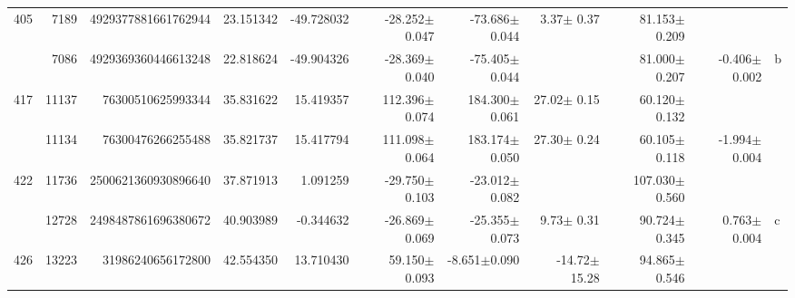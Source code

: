 \documentclass{ws-ijmpd}
\begin{document}
\begin{landscape}
\begin{longtable}{rrrrrrrrrrl}
 \hline 405 &    7189 &      4929377881661762944 &                    23.151342 &                   -49.728032 &                -28.252$\pm$0.047 &                -73.686$\pm$0.044 &           3.37$\pm$  0.37 &        81.153$\pm$0.209 &                                           &                                                    \\
            &    7086 &      4929369360446613248 &                    22.818624 &                   -49.904326 &                -28.369$\pm$0.040 &                -75.405$\pm$0.044 &                           &        81.000$\pm$0.207 &                          -0.406$\pm$0.002 &                                                  b \\
 \hline 417 &   11137 &        76300510625993344 &                    35.831622 &                    15.419357 &                112.396$\pm$0.074 &                184.300$\pm$0.061 &          27.02$\pm$  0.15 &        60.120$\pm$0.132 &                                           &                                                    \\
            &   11134 &        76300476266255488 &                    35.821737 &                    15.417794 &                111.098$\pm$0.064 &                183.174$\pm$0.050 &          27.30$\pm$  0.24 &        60.105$\pm$0.118 &                          -1.994$\pm$0.004 &                                                    \\
 \hline 422 &   11736 &      2500621360930896640 &                    37.871913 &                     1.091259 &                -29.750$\pm$0.103 &                -23.012$\pm$0.082 &                           &       107.030$\pm$0.560 &                                           &                                                    \\
            &   12728 &      2498487861696380672 &                    40.903989 &                    -0.344632 &                -26.869$\pm$0.069 &                -25.355$\pm$0.073 &           9.73$\pm$  0.31 &        90.724$\pm$0.345 &                           0.763$\pm$0.004 &                                                  c \\
 \hline 426 &   13223 &        31986240656172800 &                    42.554350 &                    13.710430 &                 59.150$\pm$0.093 &                 -8.651$\pm$0.090 &         -14.72$\pm$ 15.28 &        94.865$\pm$0.546 &                                           &                                                    \\

\end{longtable}
\end{landscape}
\end{document}
